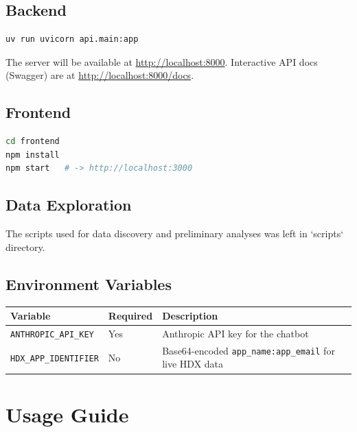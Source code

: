 \documentclass[11pt,a4paper]{article}
\newcommand{\code}[1]{\texttt{#1}}
\begin{document}
\subsection{Backend}

\begin{lstlisting}[language=bash]
uv run uvicorn api.main:app
\end{lstlisting}

The server will be available at \url{http://localhost:8000}.
Interactive API docs (Swagger) are at \url{http://localhost:8000/docs}.

\subsection{Frontend}

\begin{lstlisting}[language=bash]
cd frontend
npm install
npm start   # -> http://localhost:3000
\end{lstlisting}

\subsection{Data Exploration}

The scripts used for data discovery and preliminary analyses was left in `scripts` directory.

\subsection{Environment Variables}

\begin{center}
  \begin{tabular}{lll}
    \toprule
    Variable                    & Required & Description                                  \\
    \midrule
    \code{ANTHROPIC\_API\_KEY}  & Yes      & Anthropic API key for the chatbot            \\
    \code{HDX\_APP\_IDENTIFIER} & No       & Base64-encoded \texttt{app\_name:app\_email}
    for live HDX data                                                                     \\
    \bottomrule
  \end{tabular}
\end{center}

\section{Usage Guide}
\end{document}
